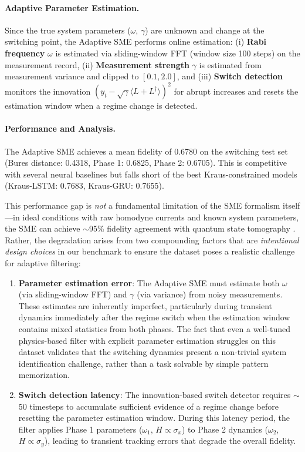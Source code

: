 \documentclass{article} %
\begin{document}
\paragraph{Adaptive Parameter Estimation.}
Since the true system parameters ($\omega$, $\gamma$) are unknown and change at the switching point, the Adaptive SME performs online estimation: (i) \textbf{Rabi frequency} $\omega$ is estimated via sliding-window FFT (window size 100 steps) on the measurement record, (ii) \textbf{Measurement strength} $\gamma$ is estimated from measurement variance and clipped to $[0.1, 2.0]$, and (iii) \textbf{Switch detection} monitors the innovation $(y_t - \sqrt{\gamma}\langle L + L^\dagger\rangle)^2$ for abrupt increases and resets the estimation window when a regime change is detected.

\paragraph{Performance and Analysis.}
The Adaptive SME achieves a mean fidelity of 0.6780 on the switching test set (Bures distance: 0.4318, Phase 1: 0.6825, Phase 2: 0.6705). This is competitive with several neural baselines but falls short of the best Kraus-constrained models (Kraus-LSTM: 0.7683, Kraus-GRU: 0.7655). 

This performance gap is \emph{not} a fundamental limitation of the SME formalism itself—in ideal conditions with raw homodyne currents and known system parameters, the SME can achieve $\sim$95\% fidelity agreement with quantum state tomography \citep{murch2013observing}. Rather, the degradation arises from two compounding factors that are \emph{intentional design choices} in our benchmark to ensure the dataset poses a realistic challenge for adaptive filtering:

\begin{enumerate}
    \item \textbf{Parameter estimation error}: The Adaptive SME must estimate both $\omega$ (via sliding-window FFT) and $\gamma$ (via variance) from noisy measurements. These estimates are inherently imperfect, particularly during transient dynamics immediately after the regime switch when the estimation window contains mixed statistics from both phases. The fact that even a well-tuned physics-based filter with explicit parameter estimation struggles on this dataset validates that the switching dynamics present a non-trivial system identification challenge, rather than a task solvable by simple pattern memorization.
    
    \item \textbf{Switch detection latency}: The innovation-based switch detector requires $\sim$50 timesteps to accumulate sufficient evidence of a regime change before resetting the parameter estimation window. During this latency period, the filter applies Phase 1 parameters ($\omega_1$, $H \propto \sigma_x$) to Phase 2 dynamics ($\omega_2$, $H \propto \sigma_y$), leading to transient tracking errors that degrade the overall fidelity.
\end{enumerate}
\end{document}
